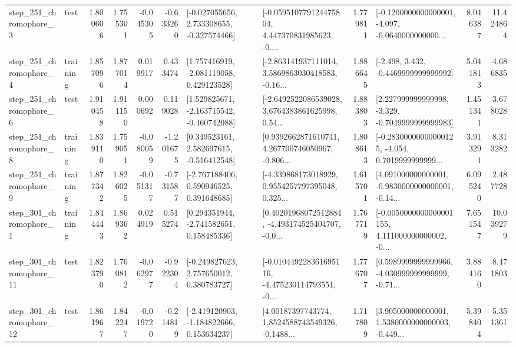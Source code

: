 \begin{tabular}{llrrrrllrlrr}
   step\_251\_chromophore\_3 &      test &      1.800606 &    1.755301 &     -0.045305 & -0.633260 &   [-0.027055656, 2.733308655, -0.327574466] &  [-0.059510779124475804, 4.447370831985623, -0.... &       1.779811 &  [-0.1200000000000001, -4.097, -0.0640000000000... &            8.046387 &         11.424864 \\
   step\_251\_chromophore\_4 &  training &      1.857096 &    1.877014 &      0.019917 &  0.433474 &    [1.757416919, -2.081119058, 0.429123528] &  [-2.863141937111014, 3.5869863030418583, -0.16... &       1.886645 &               [-2.498, 3.432, -0.4469999999999992] &            5.041813 &          4.686835 \\
   step\_251\_chromophore\_6 &      test &      1.910458 &    1.911150 &      0.000692 &  0.119028 &   [1.529825671, -2.163715542, -0.460742088] &  [-2.6492522086539028, 3.6764383861625998, 0.54... &       1.883803 &   [2.227999999999998, -3.329, -0.7049999999999983] &            1.451341 &          3.678028 \\
   step\_251\_chromophore\_8 &  training &      1.839110 &    1.759051 &     -0.080059 & -1.201675 &    [0.349523161, 2.582697615, -0.516412548] &  [0.9392662871610741, 4.267700746050967, -0.806... &       1.808613 &  [-0.28300000000000125, -4.054, 0.7019999999999... &            3.913291 &          8.313282 \\
   step\_251\_chromophore\_9 &  training &      1.877342 &    1.826025 &     -0.051317 & -0.731587 &    [-2.767188406, 0.590946525, 0.391648685] &  [-4.339868173018929, 0.9554257797395048, 0.325... &       1.615701 &  [4.091000000000001, -0.9830000000000001, -0.14... &            6.095240 &          2.487728 \\
   step\_301\_chromophore\_1 &  training &      1.844443 &    1.869362 &      0.024919 &  0.515274 &    [0.294351944, -2.741582651, 0.158485336] &  [0.40201968072512884, -4.493174525404707, -0.0... &       1.767719 &  [-0.0050000000000001155, 4.111000000000002, -0... &            7.651547 &         10.039279 \\
  step\_301\_chromophore\_11 &      test &      1.823790 &    1.760812 &     -0.062977 & -0.922304 &    [-0.249827623, 2.757650012, 0.380783727] &  [-0.010449228361695116, -4.475230114793551, -0... &       1.776707 &  [0.5989999999999966, -4.030999999999999, -0.71... &            3.884160 &          8.471803 \\
  step\_301\_chromophore\_12 &      test &      1.861967 &    1.842247 &     -0.019720 & -0.214819 &   [-2.419120903, -1.184822666, 0.153634237] &  [4.00187397743774, 1.8524588743549326, -0.1488... &       1.717809 &  [3.905000000000001, 1.5380000000000003, -0.449... &            5.398404 &          5.351361 \\

\end{tabular}
